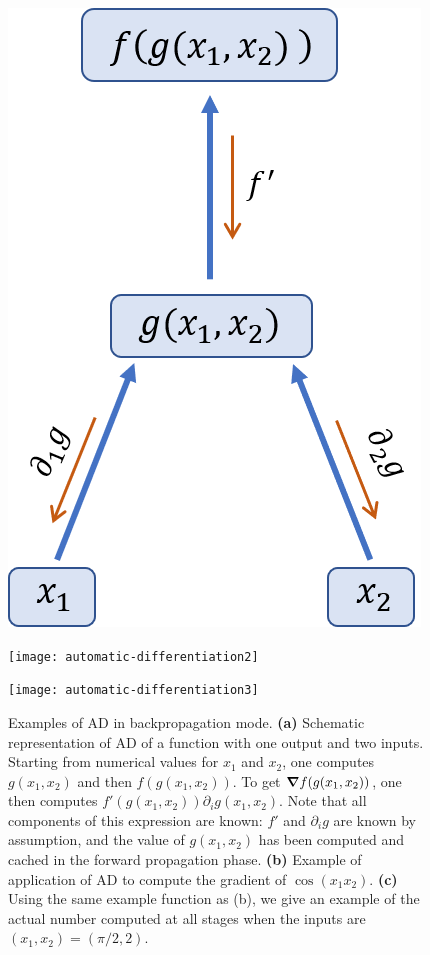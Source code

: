 \begin{figure}[tb]
	\centering
	\begin{minipage}{0.3\linewidth}
		\centering
		\includegraphics[height=1.3\textwidth]{Figures/automatic-differentiation}
	\end{minipage}\hfill
	\begin{minipage}{0.3\linewidth}
		\centering
		\texttt{[image: automatic-differentiation2]}
	\end{minipage}\hfill
	\begin{minipage}{0.3\linewidth}
		\centering
		\texttt{[image: automatic-differentiation3]}
	\end{minipage}
	\caption{
		Examples of \ac{AD} in backpropagation mode.
		\textbf{(a)}
		Schematic representation of \ac{AD} of a function with one output and two inputs.
		Starting from numerical values for $x_1$ and $x_2$, one computes $g(x_1, x_2)$ and then $f(g(x_1, x_2))$.
		To get $\grad f(g(x_1, x_2))$, one then computes $f'(g(x_1, x_2))\partial_i g(x_1, x_2)$.
		Note that all components of this expression are known: $f'$ and $\partial_i g$ are known by assumption, and the value of $g(x_1, x_2)$ has been computed and cached in the forward propagation phase.
		\textbf{(b)} Example of application of \ac{AD} to compute the gradient of $\cos(x_1 x_2)$.
		\textbf{(c)} Using the same example function as (b), we give an example of the actual number computed at all stages when the inputs are $(x_1, x_2) = (\pi / 2, 2)$.
	}
	\label{fig:automatic-differentiation}
\end{figure}

